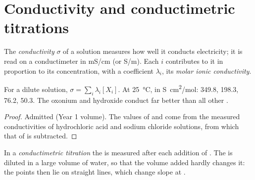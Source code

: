\section{Conductivity and conductimetric titrations}

\begin{definition}\label{def:g12:ph-conductivity-titrations:conductivity}
The \emph{conductivity} $\sigma$ of a solution
measures how well it conducts electricity; it is read on a conductimeter
in \si{mS/cm} (or \si{S/m}). Each  $i$ contributes to it in
proportion to its concentration, with a coefficient $\lambda_i$, its
\emph{molar ionic conductivity}.
\end{definition}

\begin{proposition}\label{prop:g12:ph-conductivity-titrations:kohlrausch}
For a dilute solution, $\sigma = \sum_i \lambda_i [X_i]$. At
\qty{25}{\celsius}, in \si{S.cm^2/mol}:  349.8,  198.3,
 76.2,  50.3. The oxonium and hydroxide  conduct far
better than all other .
\end{proposition}

\begin{proof}
Admitted (Year 1 volume). The values of  and  come from
the measured conductivities of hydrochloric acid and sodium chloride
solutions, from which that of  is subtracted.
\end{proof}

\begin{definition}\label{def:g12:ph-conductivity-titrations:conductimetric}
In a \emph{conductimetric titration} the
 is measured after each addition of . The  is diluted in a large volume of water, so that the volume
added hardly changes it: the points then lie on straight lines, which
change slope at .
\end{definition}


